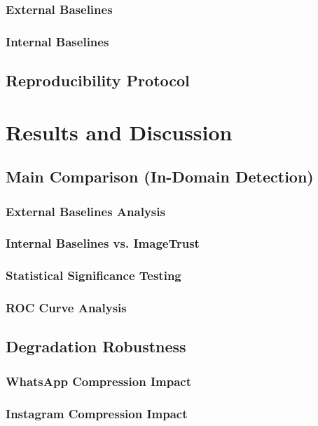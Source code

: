 \documentclass[12pt,a4paper]{book}
\theoremstyle{definition}
\theoremstyle{remark}
\begin{document}
\subsection{External Baselines}
\subsection{Internal Baselines}

\section{Reproducibility Protocol}\label{sec:reproducibility}


\chapter{Results and Discussion}\label{chap:results}

\section{Main Comparison (In-Domain Detection)}\label{sec:main-comparison}
\subsection{External Baselines Analysis}
\subsection{Internal Baselines vs. ImageTrust}
\subsection{Statistical Significance Testing}
\subsection{ROC Curve Analysis}

\section{Degradation Robustness}\label{sec:degradation}
\subsection{WhatsApp Compression Impact}
\subsection{Instagram Compression Impact}
\end{document}
